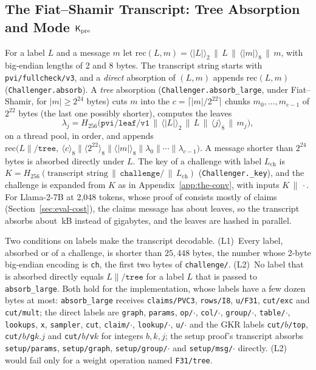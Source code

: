 \subsection{The Fiat--Shamir Transcript: Tree Absorption and Mode \texorpdfstring{$\mathsf{K}_{\mathrm{pre}}$}{Kpre}}
\label{app:fstree}

 For a label $L$ and a message $m$ let
$\mathrm{rec}(L,m)=\langle|L|\rangle_2\,\|\,L\,\|\,\langle|m|\rangle_8\,\|\,m$, with big-endian
lengths of 2 and 8 bytes. The transcript string starts with \texttt{pvi/fullcheck/v3}, and a
\emph{direct} absorption of $(L,m)$ appends $\mathrm{rec}(L,m)$ (\texttt{Challenger.absorb}). A
\emph{tree} absorption (\texttt{Challenger.absorb\_large}, under Fiat--Shamir, for
$|m|\ge2^{24}$ bytes) cuts $m$ into the $c=\lceil|m|/2^{22}\rceil$ chunks $m_0,\dots,m_{c-1}$ of
$2^{22}$ bytes (the last one possibly shorter), computes the leaves
\[
  \lambda_j=H_{256}\big(\texttt{pvi/leaf/v1}\,\|\,\langle|L|\rangle_2\,\|\,L\,\|\,\langle j\rangle_8
  \,\|\,m_j\big),
\]
on a thread pool, in order, and appends
$\mathrm{rec}\big(L\|\texttt{/tree},\ \langle c\rangle_8\|\langle2^{22}\rangle_8\|\langle|m|\rangle_8
\|\lambda_0\|\cdots\|\lambda_{c-1}\big)$. A message shorter than $2^{24}$ bytes is absorbed directly
under $L$. The key of a challenge with label $L_{\mathrm{ch}}$ is
$K=H_{256}(\text{transcript string}\,\|\,\texttt{challenge/}\,\|\,L_{\mathrm{ch}})$
(\texttt{Challenger.\_key}), and the challenge is expanded from $K$ as in
Appendix~\ref{app:the-conv}, with inputs $K\,\|\,\cdot$. For Llama-2-7B at 2{,}048 tokens, whose
proof of \ProofLlamaLongC{} consists mostly of claims (Section~\ref{sec:eval-cost}), the claims message
has about \TreeLeavesLlama{} leaves, so the transcript absorbs about \TreeKBLlama{}\,kB instead of
gigabytes, and the leaves are hashed in parallel.

 Two conditions on labels make the transcript decodable.
(L1)~Every label, absorbed or of a challenge, is shorter than $25{,}448$ bytes, the number whose
2-byte big-endian encoding is \texttt{ch}, the first two bytes of \texttt{challenge/}.
(L2)~No label that is absorbed directly equals $L\|\texttt{/tree}$ for a label $L$ that is passed to
\texttt{absorb\_large}.
Both hold for the implementation, whose labels have a few dozen bytes at most: \texttt{absorb\_large}
receives \texttt{claims/PVC3}, \texttt{rows/I8}, \texttt{u/F31}, \texttt{cut/exc} and
\texttt{cut/mult}; the direct labels are \texttt{graph}, \texttt{params}, \texttt{op/}$\cdot$,
\texttt{col/}$\cdot$, \texttt{group/}$\cdot$, \texttt{table/}$\cdot$, \texttt{lookups}, \texttt{x},
\texttt{sampler}, \texttt{cut}, \texttt{claim/}$\cdot$, \texttt{lookup/}$\cdot$, \texttt{u/}$\cdot$
and the GKR labels \texttt{cut/}$b$\texttt{/top}, \texttt{cut/}$b$\texttt{/g}$k.j$ and
\texttt{cut/}$b$\texttt{/v}$k$ for integers $b,k,j$; the setup proof's transcript absorbs
\texttt{setup/params}, \texttt{setup/graph}, \texttt{setup/group/}$\cdot$ and \texttt{setup/msg/}$\cdot$
directly. (L2) would fail only for a weight operation named \texttt{F31/tree}.

